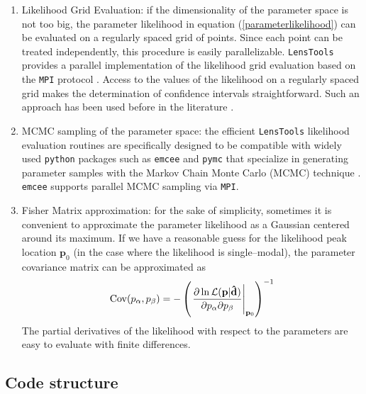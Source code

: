 \documentclass[reprint,aps,prd,superscriptaddress,showkeys,showpacs]{revtex4-1}
\newcommand{\bb}[1]{\mathbf{#1}}
\newcommand{\bbh}[1]{\mathbf{\hat{#1}}}
\newcommand{\ttt}[1]{\texttt{#1}}
\newcommand{\LT}{\texttt{LensTools} }
\begin{document}
\begin{enumerate}

\item Likelihood Grid Evaluation: if the dimensionality of the parameter space is not too big, the parameter likelihood in equation (\ref{parameterlikelihood}) can be evaluated on a regularly spaced grid of points. Since each point can be treated independently, this procedure is easily parallelizable. \LT provides a parallel implementation of the likelihood grid evaluation based on the \ttt{MPI} protocol \citep{MPI}. Access to the values of the likelihood on a regularly spaced grid makes the determination of confidence intervals straightforward. Such an approach has been used before in the literature \citep{cfhtpeaks,cfhtmink}.    

\item MCMC sampling of the parameter space: the efficient \LT likelihood evaluation routines are specifically designed to be compatible with widely used \ttt{python} packages such as \ttt{emcee} \citep{emcee} and \ttt{pymc} \citep{pymc} that specialize in generating parameter samples with the Markov Chain Monte Carlo (MCMC) technique \citep{mcmc}. \ttt{emcee} supports parallel MCMC sampling via \ttt{MPI}.    

\item Fisher Matrix approximation: for the sake of simplicity, sometimes it is convenient to approximate the parameter likelihood as a Gaussian centered around its maximum. If we have a reasonable guess for the likelihood peak location $\bb{p}_0$ (in the case where the likelihood is single--modal), the parameter covariance matrix can be approximated as 
\begin{equation}
{\rm Cov}(p_\alpha,p_\beta) = -\left(\left.\frac{\partial\ln\mathcal{L}(\bb{p}\vert\bbh{d})}{\partial p_\alpha\partial p_\beta}\right\vert_{\bb{p}_0}\right)^{-1}
\end{equation}
%
The partial derivatives of the likelihood with respect to the parameters are easy to evaluate with finite differences. 
\end{enumerate}

\subsection{Code structure}
\end{document}
